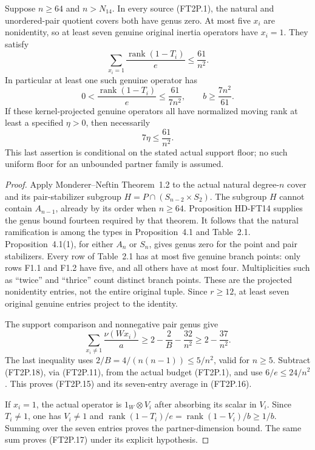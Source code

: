 \begin{theorem}[HD-FT15]
Suppose \(n\ge64\) and \(n>N_{14}\).  In every source (FT2P.1),
the natural and unordered-pair quotient covers both have genus zero.
At most five \(x_i\) are nonidentity, so at least seven genuine
original inertia operators have \(x_i=1\).  They satisfy
\[
 \sum_{x_i=1}\frac{\operatorname{rank}(1-T_i)}e
       \le\frac{61}{n^2}.
 \tag{FT2P.15}
\]
In particular at least one such genuine operator has
\[
 0<\frac{\operatorname{rank}(1-T_i)}e\le\frac{61}{7n^2},
 \qquad b\ge\frac{7n^2}{61}.
 \tag{FT2P.16}
\]
If these kernel-projected genuine operators all have normalized moving
rank at least a specified \(\eta>0\), then necessarily
\[
                      7\eta\le\frac{61}{n^2}.
 \tag{FT2P.17}
\]
This last assertion is conditional on the stated actual support floor;
no such uniform floor for an unbounded partner family is assumed.
\end{theorem}

\begin{proof}
Apply Monderer--Neftin Theorem~1.2 to the actual natural degree-\(n\)
cover and its pair-stabilizer subgroup \(H=P\cap(S_{n-2}\times S_2)\).
The subgroup \(H\) cannot contain \(A_{n-1}\), already by its order
when \(n\ge64\).  Proposition HD-FT14 supplies the genus bound
fourteen required by that theorem.  It follows that the natural
ramification is among the types in Proposition~4.1 and Table~2.1.
Proposition~4.1(1), for either \(A_n\) or \(S_n\), gives genus zero
for the point and pair stabilizers.  Every row of Table~2.1 has at
most five genuine branch points: only rows F1.1 and F1.2 have five,
and all others have at most four.  Multiplicities such as ``twice''
and ``thrice'' count distinct branch points.  These are the projected
nonidentity entries, not the entire original tuple.  Since \(r\ge12\),
at least seven original genuine entries project to the identity.

The support comparison and nonnegative pair genus give
\[
 \sum_{x_i\ne1}\frac{\nu(Wx_i)}a
 \ge2-\frac2B-\frac{32}{n^2}
 \ge2-\frac{37}{n^2}.
 \tag{FT2P.18}
\]
The last inequality uses \(2/B=4/(n(n-1))\le5/n^2\), valid for
\(n\ge5\).  Subtract (FT2P.18), via (FT2P.11), from the actual
budget (FT2P.1), and use \(6/e\le24/n^2\).  This proves
(FT2P.15) and its seven-entry average in (FT2P.16).

If \(x_i=1\), the actual operator is \(1_W\otimes V_i\) after
absorbing its scalar in \(V_i\).  Since \(T_i\ne1\), one has
\(V_i\ne1\) and
\(\operatorname{rank}(1-T_i)/e
=\operatorname{rank}(1-V_i)/b\ge1/b\).
Summing over the seven entries proves the partner-dimension bound.
The same sum proves (FT2P.17) under its explicit hypothesis.
\end{proof}

